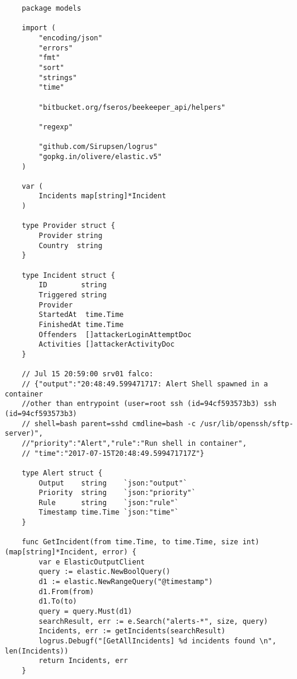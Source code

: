 \begin{verbatim}
    package models
    
    import (
        "encoding/json"
        "errors"
        "fmt"
        "sort"
        "strings"
        "time"
    
        "bitbucket.org/fseros/beekeeper_api/helpers"
    
        "regexp"
    
        "github.com/Sirupsen/logrus"
        "gopkg.in/olivere/elastic.v5"
    )
    
    var (
        Incidents map[string]*Incident
    )
    
    type Provider struct {
        Provider string
        Country  string
    }
    
    type Incident struct {
        ID        string
        Triggered string
        Provider
        StartedAt  time.Time
        FinishedAt time.Time
        Offenders  []attackerLoginAttemptDoc
        Activities []attackerActivityDoc
    }
    
    // Jul 15 20:59:00 srv01 falco: 
    // {"output":"20:48:49.599471717: Alert Shell spawned in a container 
    //other than entrypoint (user=root ssh (id=94cf593573b3) ssh (id=94cf593573b3)
    // shell=bash parent=sshd cmdline=bash -c /usr/lib/openssh/sftp-server)",
    //"priority":"Alert","rule":"Run shell in container",
    // "time":"2017-07-15T20:48:49.599471717Z"}
    
    type Alert struct {
        Output    string    `json:"output"`
        Priority  string    `json:"priority"`
        Rule      string    `json:"rule"`
        Timestamp time.Time `json:"time"`
    }
    
    func GetIncident(from time.Time, to time.Time, size int) (map[string]*Incident, error) {
        var e ElasticOutputClient
        query := elastic.NewBoolQuery()
        d1 := elastic.NewRangeQuery("@timestamp")
        d1.From(from)
        d1.To(to)
        query = query.Must(d1)
        searchResult, err := e.Search("alerts-*", size, query)
        Incidents, err := getIncidents(searchResult)
        logrus.Debugf("[GetAllIncidents] %d incidents found \n", len(Incidents))
        return Incidents, err
    }
    

\end{verbatim}
